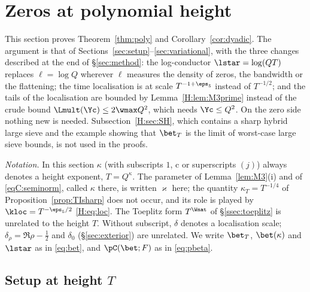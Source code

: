 
\section{Zeros at polynomial height}\label{sec:poly}

This section proves Theorem~\ref{thm:poly} and Corollary~\ref{cor:dyadic}. The argument is that of Sections~\ref{sec:setup}--\ref{sec:variational}, with the three changes described at the end of \S\ref{sec:method}: the log-conductor $\lstar=\log(QT)$ replaces $\ell=\log Q$ wherever $\ell$ measures the density of zeros, the bandwidth or the flattening; the time localisation is at scale $T^{-1+\eps_5}$ instead of $T^{-1/2}$; and the tails of the localisation are bounded by Lemma~\ref{H:lem:M3prime} instead of the crude bound $\Lmult(\Yc)\le2\wmax Q^2$, which needs $\Yc\le Q^2$. On the zero side nothing new is needed. Subsection~\ref{H:sec:SH}, which contains a sharp hybrid large sieve and the example showing that $\bet_T$ is the limit of worst-case large sieve bounds, is not used in the proofs.

\emph{Notation.} In this section $\kappa$ (with subscripts $1$, $\mathrm c$ or superscripts $(j)$) always denotes a height exponent, $T=Q^\kappa$. The parameter of Lemma~\ref{lem:M3}(i) and of \eqref{eqC:seminorm}, called $\kappa$ there, is written $\varkappa$ here; the quantity $\kappa_T=T^{-1/4}$ of Proposition~\ref{prop:TIsharp} does not occur, and its role is played by $\kloc=T^{-\eps_5/2}$ \eqref{H:eq:loc}. The Toeplitz form $T^\Wnat$ of \S\ref{ssec:toeplitz} is unrelated to the height $T$. Without subscript, $\delta$ denotes a localisation scale; $\delta_\rho=\Re\rho-\frac12$ and $\delta_0$ (\S\ref{sec:exterior}) are unrelated. We write $\bet_T$, $\bet(\kappa)$ and $\lstar$ as in \eqref{eq:bet}, and $\pC(\bet;F)$ as in \eqref{eq:pbeta}.

\subsection{Setup at height \texorpdfstring{$T$}{T}}\label{H:sec:setup}

